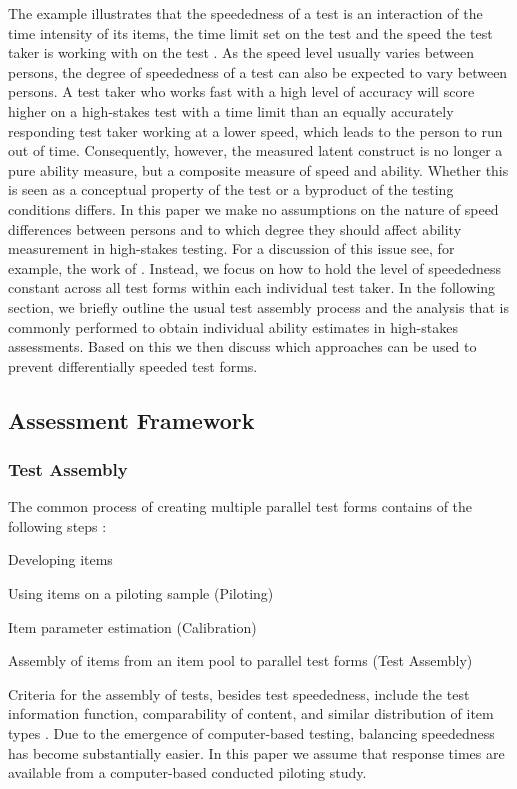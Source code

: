 \documentclass[a4paper,man,apacite,floatsintext,donotrepeattitle]{apa6}
\begin{document}
The example illustrates that the speededness of a test is an interaction of the time intensity of its items, the time limit set on the test and the speed the test taker is working with on the test \cite{vanderLinden.2011ATA}. As the speed level usually varies between persons, the degree of speededness of a test can also be expected to vary between persons. A test taker who works fast with a high level of accuracy will score higher on a high-stakes test with a time limit than an equally accurately responding test taker working at a lower speed, which leads to the person to run out of time. Consequently, however, the measured latent construct is no longer a pure ability measure, but a composite measure of speed and ability. Whether this is seen as a conceptual property of the test or a byproduct of the testing conditions differs. In this paper we make no assumptions on the nature of speed differences between persons and to which degree they should affect ability measurement in high-stakes testing. For a discussion of this issue see, for example, the work of . Instead, we focus on how to hold the level of speededness constant across all test forms within each individual test taker. In the following section, we briefly outline the usual test assembly process and the analysis that is commonly performed to obtain individual ability estimates in high-stakes assessments. Based on this we then discuss which approaches can be used to prevent differentially speeded test forms.

\subsection{Assessment Framework}
\subsubsection{Test Assembly}
The common process of creating multiple parallel test forms contains of the following steps \cite{SAT.2016, vanderLinden.2005}: 
\begin{APAenumerate}
\item Developing items 
\item Using items on a piloting sample (Piloting)
\item Item parameter estimation (Calibration)
\item Assembly of items from an item pool to parallel test forms (Test Assembly)
\end{APAenumerate}
Criteria for the assembly of tests, besides test speededness, include the test information function, comparability of content, and similar distribution of item types \cite{vanderLinden.2005}. Due to the emergence of computer-based testing, balancing speededness has become substantially easier. In this paper we assume that response times are available from a computer-based conducted piloting study. 
\end{document}
